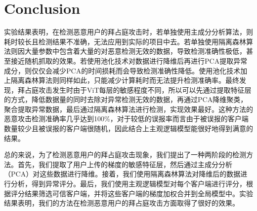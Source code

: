 \documentclass[conference]{IEEEtran}
\begin{document}








\section{Conclusion}
\label{sec:conclusion}



实验结果表明，在检测恶意用户的拜占庭攻击时，若单独使用主成分分析算法，则耗时较长且检测结果不准确，无法应用到实际的项目中去。若单独使用隔离森林算法则因大量参数中包含着大量的对恶意检测无效的数据，导致检测准确性极低，甚至接近随机抓取的效果。若使用池化技术\cite{betterTogether}对数据进行降维后再进行PCA提取异常成分，则仅仅会减少PCA的时间损耗而会导致检测准确性降低。使用池化技术加上隔离森林算法则同样如此，只能减少计算耗时而无法提升检测准确率。最终发现，拜占庭攻击发生时由于ViT每层的敏感程度不同，所以可以先通过提取特征层的方式，降低数据量的同时去除对异常检测无效的数据，再通过PCA降维聚类，聚合提取异常数据，最后通过隔离森林算法进行检测，实现效果最好。这种方法的恶意攻击检测准确率几乎达到100\%，对于较低的误报率而言由于被误报的客户端数量较少且被误报的客户端很随机，因此结合上主观逻辑模型能很好地得到满意的结果。

总的来说，为了检测恶意用户的拜占庭攻击现象，我们提出了一种两阶段的检测方法。首先，我们提取了用户上传的梯度的敏感特征层，然后通过主成分分析（PCA）对这些数据进行降维。接着，我们使用隔离森林算法对降维后的数据进行分析，得到异常评分。最后，我们使用主观逻辑模型对每个客户端进行评分，根据评分结果筛选可信客户端，并将这些客户端的梯度加权合并到全局模型中。实验结果表明，我们的方法在检测恶意用户的拜占庭攻击方面取得了很好的效果。

\end{document}
